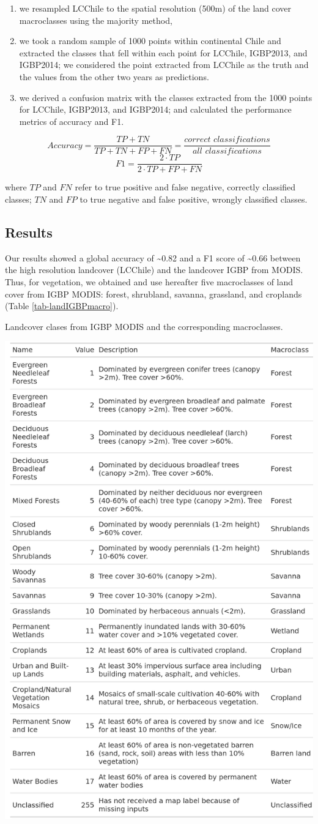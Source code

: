 \documentclass[
  authoryear,
  preprint,
  3p,
  onecolumn]{elsarticle}
\providecommand{\tightlist}{%
  \setlength{\itemsep}{0pt}\setlength{\parskip}{0pt}}\usepackage{longtable,booktabs,array}
\begin{document}
\begin{enumerate}
\def\labelenumi{\roman{enumi})}
\tightlist
\item
  we resampled LCChile to the spatial resolution (500m) of the land
  cover macroclasses using the majority method,
\item
  we took a random sample of 1000 points within continental Chile and
  extracted the classes that fell within each point for LCChile,
  IGBP2013, and IGBP2014; we considered the point extracted from LCChile
  as the truth and the values from the other two years as predictions.
\item
  we derived a confusion matrix with the classes extracted from the 1000
  points for LCChile, IGBP2013, and IGBP2014; and calculated the
  performance metrics of accuracy and F1.
\end{enumerate}

\[Accuracy = \frac{TP+TN}{TP+TN+FP+FN}=\frac{correct\,\, classifications}{all\,\, classifications}\]
\[F1=\frac{2\cdot TP}{2\cdot TP + FP +FN}\]

where \(TP\) and \(FN\) refer to true positive and false negative,
correctly classified classes; \(TN\) and \(FP\) to true negative and
false positive, wrongly classified classes.

\subsection{Results}\label{results-1}

Our results showed a global accuracy of \textasciitilde0.82 and a F1
score of \textasciitilde0.66 between the high resolution landcover
(LCChile) and the landcover IGBP from MODIS. Thus, for vegetation, we
obtained and use hereafter five macroclasses of land cover from IGBP
MODIS: forest, shrubland, savanna, grassland, and croplands (Table
\ref{tab-landIGBPmacro}).

\begin{table}[!ht]
\caption{Landcover clases from IGBP MODIS and the corresponding macroclasses.}
\label{tab-landIGBPmacro}
\centering
\includegraphics[width = .5\textwidth]{../output/figs/tabla_landcover_macroclass.png}
\end{table}
\end{document}
